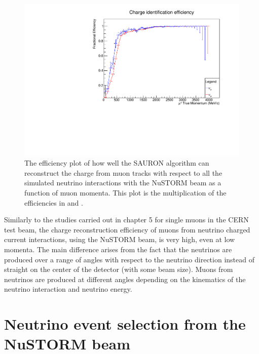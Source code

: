 \begin{figure}[h!]
\centering
\includegraphics[width=.9\textwidth]{figures/NeutrinoChap/CombinedNuStormChargeFittedEff.pdf}
\caption{The efficiency plot of how well the SAURON algorithm can reconstruct the charge from muon tracks with respect to all the simulated neutrino interactions with the NuSTORM beam as a function of muon momenta. This plot is the multiplication of the efficiencies in  and .}
\label{fig:NuSTORMTASDCombined}
\end{figure}

Similarly to the studies carried out in chapter 5 for single muons in the CERN test beam, the charge reconstruction efficiency of muons from neutrino charged current interactions, using the NuSTORM beam, is very high, even at low momenta. The main difference arises from the fact that the neutrinos are produced over a range of angles with respect to the neutrino direction instead of straight on the center of the detector (with some beam size). Muons from neutrinos are produced at different angles depending on the kinematics of the neutrino interaction and neutrino energy. 

\section{Neutrino event selection from the NuSTORM beam}


